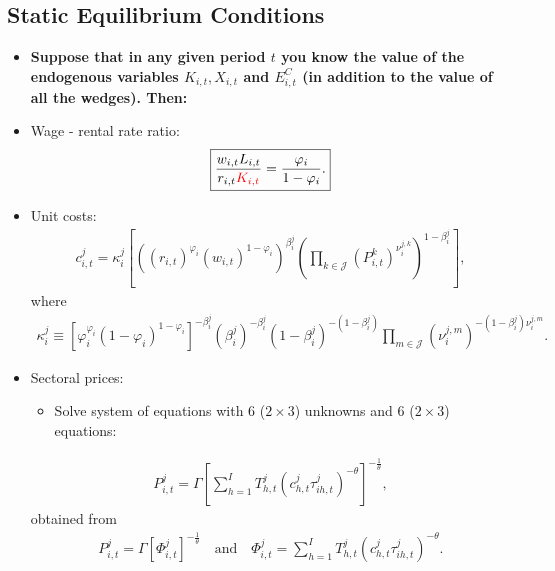 \documentclass{article}
\begin{document}
\subsection{Static Equilibrium Conditions}

\begin{itemize}
    \item \textbf{Suppose that in any given period $t$ you know the value of the endogenous variables {\color{red}$K_{i,t},X_{i,t}$} and {\color{red}$E_{i,t}^{C}$} (in addition to the value of all the wedges). Then:} 
\end{itemize}

\begin{itemize}
    \item Wage - rental rate ratio:
    \begin{align}
        \boxed{\frac{w_{i,t} L_{i,t}}{r_{i,t} {\color{red}K_{i,t}}} = \frac{\varphi_{i}}{1-\varphi_{i}}.}
        \label{eq:KLratio}
    \end{align}
\end{itemize}

\begin{itemize}
    \item Unit costs:
    \begin{align}
        \boxed{c_{i,t}^{j} = \kappa^j_i \left[\left(\left(r_{i,t}\right)^{\varphi_i}\left(w_{i,t}\right)^{1-\varphi_i}\right)^{\beta^j_i}
      \left(\prod_{k\in\mathcal{J}}\left(P^k_{i,t}\right)^{\nu^{j,k}_i}\right)^{1-\beta^j_i}\right],}
      \label{eq:UnitCosts}
    \end{align}
    where
    \begin{align*}
        \kappa^j_i \equiv \left[\varphi_i^{\varphi_i}(1-\varphi_i)^{1-\varphi_i}\right]^{-\beta^j_i} \left(\beta^j_i\right)^{-\beta^j_i}
      \left(1-\beta^j_i\right)^{-(1-\beta^j_i)} \prod_{m\in\mathcal{J}}\left(\nu^{j,m}_i\right)^{-(1-\beta^j_i)\nu^{j,m}_i}.
    \end{align*}
\end{itemize}

\begin{itemize}
    \item Sectoral prices:
    \begin{itemize}
        \item Solve system of equations with 6 ($2\times3$) unknowns and 6 ($2\times3$) equations:
    \end{itemize}
    \begin{align}
        \boxed{P^j_{i,t} = \Gamma \left[ \sum_{h=1}^{I} T_{h,t}^{j} (c_{h,t}^{j} \tau_{ih,t}^{j})^{-\theta} \right]^{-\frac{1}{\theta}},}
        \label{eq:SecPrices}
    \end{align}
    obtained from 
    \begin{align*}
        P^j_{i,t} = \Gamma \left[ \Phi_{i,t}^{j} \right]^{-\frac{1}{\theta}}\text{~~~and~~~}\Phi_{i,t}^{j} = \sum_{h=1}^{I} T_{h,t}^{j} (c_{h,t}^{j} \tau_{ih,t}^{j})^{-\theta}.
    \end{align*}
\end{itemize}
\end{document}
